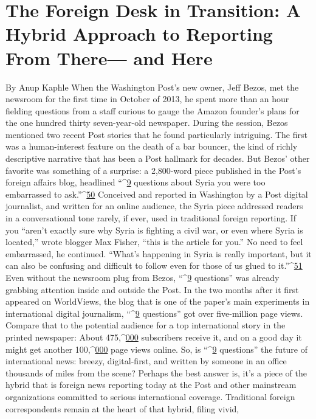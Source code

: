 \chapter{The Foreign Desk in Transition: A Hybrid Approach to Reporting From There—
and Here}
By Anup Kaphle
When the Washington Post’s new owner, Jeff Bezos, met the newsroom for the first time
in October of 2013, he spent more than an hour fielding questions from a staff curious to
gauge the Amazon founder’s plans for the one hundred thirty seven-year-old newspaper.
During the session, Bezos mentioned two recent Post stories that he found particularly
intriguing.
The first was a human-interest feature on the death of a bar bouncer, the kind of richly
descriptive narrative that has been a Post hallmark for decades. But Bezos’ other favorite
was something of a surprise: a 2,800-word piece published in the Post’s foreign affairs
blog, headlined ``^{\href{#endnotes}{9}} questions about Syria you were too embarrassed to ask.''^{\href{#endnotes}{50}}
Conceived and reported in Washington by a Post digital journalist, and written for an
online audience, the Syria piece addressed readers in a conversational tone rarely, if ever,
used in traditional foreign reporting. If you ``aren’t exactly sure why Syria is fighting a
civil war, or even where Syria is located,'' wrote blogger Max Fisher, ``this is the article
for you.'' No need to feel embarrassed, he continued. ``What’s happening in Syria is really
important, but it can also be confusing and difficult to follow even for those of us glued
to it.''^{\href{#endnotes}{51}}
Even without the newsroom plug from Bezos, ``^{\href{#endnotes}{9}} questions'' was already grabbing
attention inside and outside the Post. In the two months after it first appeared on
WorldViews, the blog that is one of the paper’s main experiments in international digital
journalism, ``^{\href{#endnotes}{9}} questions'' got over five-million page views. Compare that to the potential
audience for a top international story in the printed newspaper: About 475,^{\href{#endnotes}{000}}
subscribers receive it, and on a good day it might get another 100,^{\href{#endnotes}{000}} page views online.
So, is ``^{\href{#endnotes}{9}} questions'' the future of international news: breezy, digital-first, and written by
someone in an office thousands of miles from the scene? Perhaps the best answer is, it’s a
piece of the hybrid that is foreign news reporting today at the Post and other mainstream
organizations committed to serious international coverage.
Traditional foreign correspondents remain at the heart of that hybrid, filing vivid,
